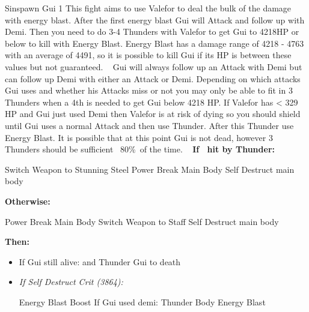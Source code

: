 \begin{battle}[12000]{Sinspawn Gui 1}
This fight aims to use Valefor to deal the bulk of the damage with energy blast. After the first energy blast Gui will Attack and follow up with Demi. Then you need to do 3-4 Thunders with Valefor to get Gui to 4218HP or below to kill with Energy Blast. Energy Blast has a damage range of 4218 - 4763 with an average of 4491, so it is possible to kill Gui if its HP is between these values but not guaranteed.
\newline\ \newline
Gui will always follow up an Attack with Demi but can follow up Demi with either an Attack or Demi. Depending on which attacks Gui uses and whether his Attacks miss or not you may only be able to fit in 3 Thunders when a 4th is needed to get Gui below 4218 HP. If Valefor has < 329 HP and Gui just used Demi then Valefor is at risk of dying so you should shield until Gui uses a normal Attack and then use Thunder. After this Thunder use Energy Blast. It is possible that at this point Gui is not dead, however 3 Thunders should be sufficient ~80\%\ of the time.
\newline\ \newline
\textbf{If \yuna\ hit by Thunder:}
	\begin{itemize}
		\tidusf Switch Weapon to Stunning Steel
		\switch{\yuna}{\auron}
		\auronf Power Break Main Body
		\switch{\wakka}{\kimahri}
		\kimahrif Self Destruct main body
		\switch{\tidus}{\yuna}
		\summon{\valefor}
	\end{itemize}
\vspace{\baselineskip}
\textbf{Otherwise:}
	\begin{itemize}
		\switch{\tidus}{\auron}
		\auronf Power Break Main Body
		\yunaf Switch Weapon to Staff
		\switch{\wakka}{\kimahri}
		\kimahrif Self Destruct main body
		\summon{\valefor}
	\end{itemize}
\vspace{\baselineskip}
\textbf{Then:}
	\begin{itemize}
		\valeforf Energy Blast
		\enemyf Attack
		\enemyf Demi
		\valeforf Thunder Body
		\enemyf Attack / Demi
		\valeforf Thunder Body
		\enemyf Attack / Demi
		\valeforf Thunder Body 1x-2x (If HP < 329 and last action was Demi, use shield until gui attacks then use Thunder)
		\valeforf Energy Blast
		\item If Gui still alive:  and Thunder Gui to death
		\item \textit{If Self Destruct Crit \textit{(3864)}:}
			\begin{itemize}
				\valeforf Energy Blast
				\valeforf Boost
				\valeforf If Gui used demi: Thunder Body
				\valeforf Energy Blast
			\end{itemize}
	\end{itemize}
\end{battle}
